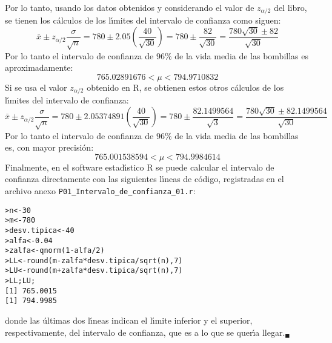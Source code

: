 \begin{solucion}
 Por lo tanto, usando los datos obtenidos y considerando el valor de $z_{\alpha/2}$ del libro, se tienen los c\'alculos de los l\'{\i}mites del intervalo de confianza como siguen:
 \begin{equation*}
  \bar{x} \pm z_{\alpha/2}\frac{\sigma}{\sqrt{n}} = 780 \pm 2.05\left( \frac{40}{\sqrt{30}} \right) = 780\pm \frac{82}{\sqrt{30}} = \frac{780\sqrt{30}\pm82}{\sqrt{30}}
 \end{equation*}
 Por lo tanto el intervalo de confianza de $96\%$ de la vida media de las bombillas es aproximadamente:
 \begin{equation*}
  765.02891676 < \mu < 794.9710832
 \end{equation*}
 Si se usa el valor $z_{\alpha/2}$ obtenido en R, se obtienen estos otros c\'alculos de los l\'{\i}mites del intervalo de confianza:
 \begin{equation*}
  \bar{x} \pm z_{\alpha/2}\frac{\sigma}{\sqrt{n}} = 780 \pm 2.05374891\left( \frac{40}{\sqrt{30}} \right) = 780\pm \frac{82.1499564}{\sqrt{3}} = \frac{780\sqrt{30}\pm82.1499564}{\sqrt{30}}
 \end{equation*}
 Por lo tanto el intervalo de confianza de $96\%$ de la vida media de las bombillas es, con mayor precisi\'on:
 \begin{equation*}
  765.001538594 < \mu < 794.9984614
 \end{equation*}
 Finalmente, en el software estad\'{\i}stico R se puede calcular el intervalo de confianza directamente con las siguientes l\'{\i}neas de c\'odigo, registradas en el archivo anexo \texttt{P01\_Intervalo\_de\_confianza\_01.r}:
 \begin{verbatim}
>n<-30
>m<-780
>desv.tipica<-40
>alfa<-0.04
>zalfa<-qnorm(1-alfa/2)
>LL<-round(m-zalfa*desv.tipica/sqrt(n),7)
>LU<-round(m+zalfa*desv.tipica/sqrt(n),7)
>LL;LU;
[1] 765.0015
[1] 794.9985
 \end{verbatim}
 \vspace{-0.5cm}
 donde las \'ultimas dos l\'{\i}neas indican el l\'{\i}mite inferior y el superior, respectivamente, del intervalo de confianza, que es a lo que se quer\'{\i}a llegar.${}_{\blacksquare}$
\end{solucion}

